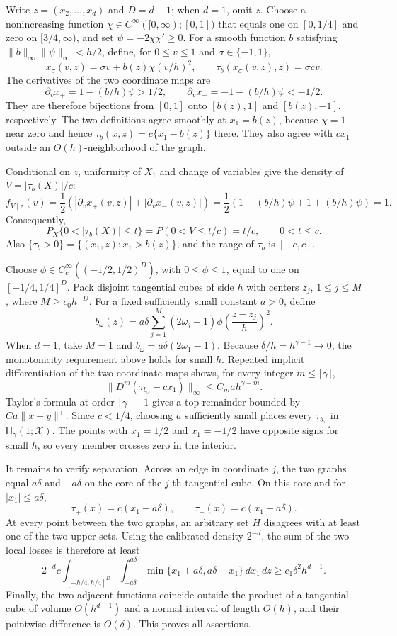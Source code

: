 Write \(z=(x_2,\ldots,x_d)\) and \(D=d-1\); when \(d=1\), omit \(z\). Choose a nonincreasing function \(\chi\in C^\infty([0,\infty);[0,1])\) that equals one on \([0,1/4]\) and zero on \([3/4,\infty)\), and set \(\psi=-2\chi\chi'\ge0\). For a smooth function \(b\) satisfying \(\|b\|_\infty\|\psi\|_\infty<h/2\), define, for \(0\le v\le1\) and \(\sigma\in\{-1,1\}\),
\[
 x_\sigma(v,z)=\sigma v+b(z)\chi(v/h)^2,
 \qquad
 \tau_b(x_\sigma(v,z),z)=\sigma cv.
\]
The derivatives of the two coordinate maps are
\[
 \partial_vx_+=1-(b/h)\psi>1/2,
 \qquad
 \partial_vx_-=-1-(b/h)\psi<-1/2.
\]
They are therefore bijections from \([0,1]\) onto \([b(z),1]\) and \([b(z),-1]\), respectively. The two definitions agree smoothly at \(x_1=b(z)\), because \(\chi=1\) near zero and hence \(\tau_b(x,z)=c\{x_1-b(z)\}\) there. They also agree with \(cx_1\) outside an \(O(h)\)-neighborhood of the graph.

Conditional on \(z\), uniformity of \(X_1\) and change of variables give the density of \(V=|\tau_b(X)|/c\):
\[
 f_{V\mid z}(v)
 =\frac12\left(|\partial_vx_+(v,z)|+|\partial_vx_-(v,z)|\right)
 =\frac12\left(1-(b/h)\psi+1+(b/h)\psi\right)=1.
\]
Consequently,
\[
 P_X\{0<|\tau_b(X)|\le t\}=P(0<V\le t/c)=t/c,
 \qquad 0<t\le c.
\]
Also \(\{\tau_b>0\}=\{(x_1,z):x_1>b(z)\}\), and the range of \(\tau_b\) is \([-c,c]\).

Choose \(\phi\in C_c^\infty((-1/2,1/2)^D)\), with \(0\le\phi\le1\), equal to one on \([-1/4,1/4]^D\). Pack disjoint tangential cubes of side \(h\) with centers \(z_j\), \(1\le j\le M\), where \(M\ge c_0h^{-D}\). For a fixed sufficiently small constant \(a>0\), define
\[
 b_\omega(z)=a\delta\sum_{j=1}^M(2\omega_j-1)
 \phi\!\left(\frac{z-z_j}{h}\right)^2.
\]
When \(d=1\), take \(M=1\) and \(b_\omega=a\delta(2\omega_1-1)\). Because \(\delta/h=h^{\gamma-1}\to0\), the monotonicity requirement above holds for small \(h\). Repeated implicit differentiation of the two coordinate maps shows, for every integer \(m\le\lceil\gamma\rceil\),
\[
 \|D^m(\tau_{b_\omega}-cx_1)\|_\infty\le C_ma h^{\gamma-m}.
\]
Taylor's formula at order \(\lceil\gamma\rceil-1\) gives a top remainder bounded by \(C a\|x-y\|^\gamma\). Since \(c<1/4\), choosing \(a\) sufficiently small places every \(\tau_{b_\omega}\) in \(\mathsf H_\gamma(1;\mathcal X)\). The points with \(x_1=1/2\) and \(x_1=-1/2\) have opposite signs for small \(h\), so every member crosses zero in the interior.

It remains to verify separation. Across an edge in coordinate \(j\), the two graphs equal \(a\delta\) and \(-a\delta\) on the core of the \(j\)-th tangential cube. On this core and for \(|x_1|\le a\delta\),
\[
 \tau_+(x)=c(x_1-a\delta),
 \qquad
 \tau_-(x)=c(x_1+a\delta).
\]
At every point between the two graphs, an arbitrary set \(H\) disagrees with at least one of the two upper sets. Using the calibrated density \(2^{-d}\), the sum of the two local losses is therefore at least
\[
 2^{-d}c\int_{[-h/4,h/4]^D}
 \int_{-a\delta}^{a\delta}
 \min\{x_1+a\delta,a\delta-x_1\}\,dx_1\,dz
 \ge c_1\delta^2h^{d-1}.
\]
Finally, the two adjacent functions coincide outside the product of a tangential cube of volume \(O(h^{d-1})\) and a normal interval of length \(O(h)\), and their pointwise difference is \(O(\delta)\). This proves all assertions.